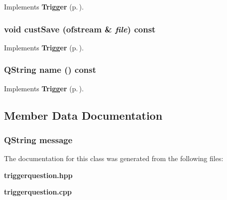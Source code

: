 Implements {\bf Trigger} {\rm (p.\,\pageref{classTrigger_b0})}.
\subsubsection{\setlength{\rightskip}{0pt plus 5cm}void cust\-Save (ofstream \& {\em file}) const\hspace{0.3cm}{\tt  [virtual]}}\label{classTriggerQuestion_a3}




Implements {\bf Trigger} {\rm (p.\,\pageref{classTrigger_b1})}.
\subsubsection{\setlength{\rightskip}{0pt plus 5cm}QString name () const\hspace{0.3cm}{\tt  [virtual]}}\label{classTriggerQuestion_a5}




Implements {\bf Trigger} {\rm (p.\,\pageref{classTrigger_a7})}.

\subsection{Member Data Documentation}
\subsubsection{\setlength{\rightskip}{0pt plus 5cm}QString {\bf message}}\label{classTriggerQuestion_o0}




The documentation for this class was generated from the following files:\begin{CompactItemize}
\item 
{\bf triggerquestion.hpp}\item 
{\bf triggerquestion.cpp}\end{CompactItemize}
